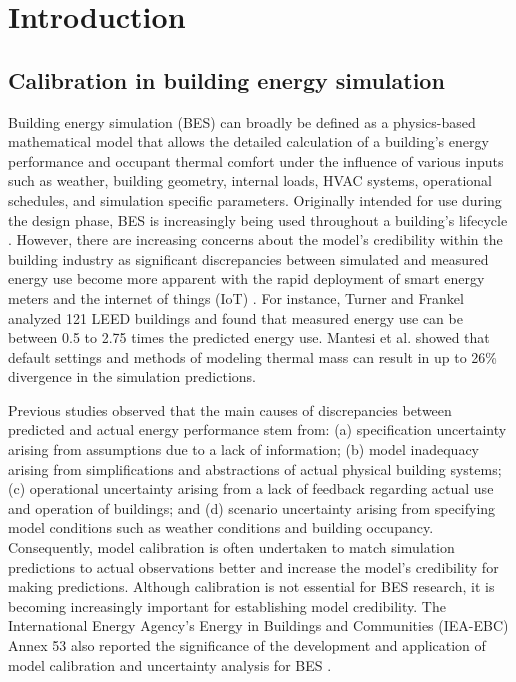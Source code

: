 \documentclass[review]{elsarticle}
\begin{document}
\linenumbers
\section{Introduction}

\subsection{Calibration in building energy simulation}
Building energy simulation (BES) can broadly be defined as a physics-based mathematical model that allows the detailed calculation of a building's energy performance and occupant thermal comfort under the influence of various inputs such as weather, building geometry, internal loads, HVAC systems, operational schedules, and simulation specific parameters. Originally intended for use during the design phase, BES is increasingly being used throughout a building's lifecycle \cite{hensen2019building}. However, there are increasing concerns about the model's credibility within the building industry as significant discrepancies between simulated and measured energy use become more apparent with the rapid deployment of smart energy meters and the internet of things (IoT) \cite{de2014gap}. For instance, Turner and Frankel \cite{turner2008energy} analyzed 121 LEED buildings and found that measured energy use can be between 0.5 to 2.75 times the predicted energy use. Mantesi et al. \cite{mantesi2018modelling} showed that default settings and methods of modeling thermal mass can result in up to 26\% divergence in the simulation predictions. 

Previous studies \cite{menezes2012predicted, de2002analysis} observed that the main causes of discrepancies between predicted and actual energy performance stem from: (a) specification uncertainty arising from assumptions due to a lack of information; (b) model inadequacy arising from simplifications and abstractions of actual physical building systems; (c) operational uncertainty arising from a lack of feedback regarding actual use and operation of buildings; and (d) scenario uncertainty arising from specifying model conditions such as weather conditions and building occupancy. Consequently, model calibration is often undertaken to match simulation predictions to actual observations better and increase the model's credibility for making predictions. Although calibration is not essential for BES research, it is becoming increasingly important for establishing model credibility. The International Energy Agency's Energy in Buildings and Communities (IEA-EBC) Annex 53 also reported the significance of the development and application of model calibration and uncertainty analysis for BES \cite{yoshino2017iea}. 
\end{document}
